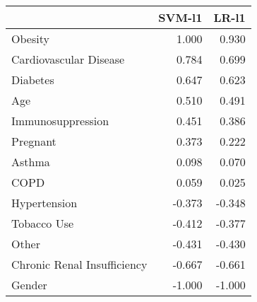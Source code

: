 \begin{tabular}{lrr}
\toprule
{} &  SVM-l1 &  LR-l1 \\
\midrule
Obesity                     &   1.000 &  0.930 \\
Cardiovascular Disease      &   0.784 &  0.699 \\
Diabetes                    &   0.647 &  0.623 \\
Age                         &   0.510 &  0.491 \\
Immunosuppression           &   0.451 &  0.386 \\
Pregnant                    &   0.373 &  0.222 \\
Asthma                      &   0.098 &  0.070 \\
COPD                        &   0.059 &  0.025 \\
Hypertension                &  -0.373 & -0.348 \\
Tobacco Use                 &  -0.412 & -0.377 \\
Other                       &  -0.431 & -0.430 \\
Chronic Renal Insufficiency &  -0.667 & -0.661 \\
Gender                      &  -1.000 & -1.000 \\
\bottomrule
\end{tabular}
